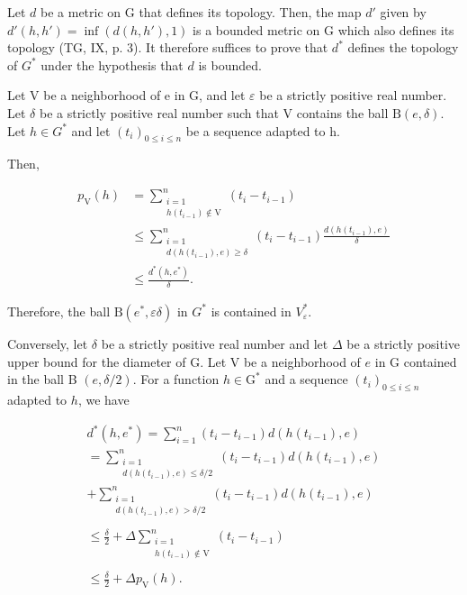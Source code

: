 Let \(d\) be a metric on G that defines its topology. Then, the map \(d'\) given by \(d'(h,h') = \inf (d(h,h'),1)\) is a bounded metric on G which also defines its topology (TG, IX, p. 3). It therefore suffices to prove that \(d^{*}\) defines the topology of \(G^{*}\) under the hypothesis that \(d\) is bounded.

Let V be a neighborhood of e in G, and let \(\varepsilon\) be a strictly positive real number. Let \(\delta\) be a strictly positive real number such that V contains the ball \(\mathrm{B}(e,\delta)\). Let \(h \in G^{*}\) and let \((t_{i})_{0 \leqslant i \leqslant n}\) be a sequence adapted to h.

Then,

\[
\begin{aligned} p_{\mathrm{V}}(h) & = \sum_{\substack{i = 1\\ h(t_{i - 1})\not\in\mathrm{V}}}^{n}(t_{i} - t_{i - 1})\\ & \leqslant \sum_{\substack{i = 1\\ d(h(t_{i - 1}),e)\geqslant \delta}}^{n}(t_{i} - t_{i - 1})\frac{d(h(t_{i - 1}),e)}{\delta}\\ & \leqslant \frac{d^{*}(h,e^{*})}{\delta}. \end{aligned}
\]

Therefore, the ball \(\mathrm{B}(e^{*},\varepsilon\delta)\) in \(G^{*}\) is contained in \(V_{\varepsilon}^{*}\).

Conversely, let \(\delta\) be a strictly positive real number and let \(\Delta\) be a strictly positive upper bound for the diameter of G. Let V be a neighborhood of \(e\) in G contained in the ball B \((e,\delta/2)\). For a function \(h\in\mathrm{G}^{*}\) and a sequence \((t_{i})_{0\leqslant i\leqslant n}\) adapted to \(h\), we have

\[
\begin{array}{l}d^{*}(h,e^{*}) = \sum_{i = 1}^{n}(t_{i} - t_{i - 1})d(h(t_{i - 1}),e)\\ = \sum_{\substack{i = 1\\ d(h(t_{i - 1}),e)\leqslant \delta /2}}^{n}(t_{i} - t_{i - 1})d(h(t_{i - 1}),e)\\ +\sum_{\substack{i = 1\\ d(h(t_{i - 1}),e) > \delta /2}}^{n}(t_{i} - t_{i - 1})d(h(t_{i - 1}),e)\\ \\ \leqslant \frac{\delta}{2} +\Delta \sum_{\substack{i = 1\\ h(t_{i - 1})\not\in\mathrm{V}}}^{n}(t_{i} - t_{i - 1})\\ \\ \leqslant \frac{\delta}{2} +\Delta p_{\mathrm{V}}(h). \end{array}
\]

